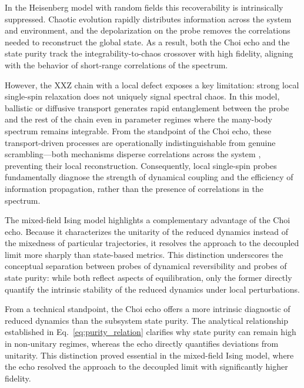 \documentclass[pra,twocolumn,aps,showpacs,superscriptaddress,longbibliography]{revtex4-2}%
\providecommand{\DIFadd}[1]{{\protect\color{blue} \sf #1}} %
\providecommand{\DIFdel}[1]{{\protect\color{red} \scriptsize #1}} %
\providecommand{\DIFaddbegin}{} %
\providecommand{\DIFaddend}{} %
\providecommand{\DIFdelbegin}{} %
\providecommand{\DIFdelend}{} %
\begin{document}
In the Heisenberg model with random fields this recoverability is intrinsically suppressed. Chaotic evolution rapidly distributes information across the system and environment, and the depolarization on the probe removes the correlations needed to reconstruct the global state. As a result, both the Choi echo and the state purity track the integrability-to-chaos crossover with high fidelity, aligning with the behavior of short-range correlations of the spectrum.

However, the XXZ chain with a local defect exposes a key limitation: strong \DIFdelbegin \DIFdel{local }\DIFdelend \DIFaddbegin \DIFadd{single-spin }\DIFaddend relaxation does not uniquely signal spectral chaos. In this model, ballistic or diffusive transport generates rapid entanglement between the probe and the rest of the chain even in parameter regimes where the many-body spectrum remains integrable. From the standpoint of the Choi echo, these transport-driven processes are operationally indistinguishable from genuine scrambling—both mechanisms disperse correlations across the system\DIFdelbegin \DIFdel{, preventing their local reconstruction}\DIFdelend . Consequently, \DIFdelbegin \DIFdel{local }\DIFdelend \DIFaddbegin \DIFadd{single-spin }\DIFaddend probes fundamentally diagnose the strength of dynamical coupling and the efficiency of information propagation, rather than the presence of correlations in the spectrum.

The mixed-field Ising model highlights a complementary advantage of the Choi echo. Because it characterizes the unitarity of the reduced dynamics instead of the mixedness of particular trajectories, it resolves the approach to the decoupled limit more sharply than state-based metrics. This distinction underscores the conceptual separation between probes of dynamical reversibility and probes of state purity: while both reflect aspects of equilibration, only the former directly quantify the intrinsic stability of the reduced dynamics under local perturbations.

From a technical standpoint, the Choi echo offers a more intrinsic diagnostic of reduced dynamics than the subsystem state purity. The analytical relationship established in Eq.~\eqref{eq:purity_relation} clarifies why state purity can remain high in non-unitary regimes, whereas the echo directly quantifies deviations from unitarity. This distinction proved essential in the mixed-field Ising model, where the echo resolved the approach to the decoupled limit with significantly higher fidelity.
\end{document}
